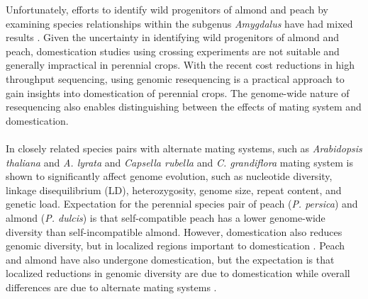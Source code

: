 \documentclass[12pt]{article}
\begin{document}
%
Unfortunately, efforts to identify wild progenitors of almond and peach by examining species relationships within the subgenus \emph{Amygdalus} have had mixed results \citep{verde2013high, aradhya2004molecular, zeinalabedini2010origin, mowrey1990isozyme, browicz1996genus, ladizinsky1999origin, bassi20081}. 
%
Given the uncertainty in identifying wild progenitors of almond and peach, domestication studies using crossing experiments are not suitable and generally impractical in perennial crops.
%
With the recent cost reductions in high throughput sequencing, using genomic resequencing is a practical approach to gain insights into domestication of perennial crops.
%
The genome-wide nature of resequencing also enables distinguishing between the effects of mating system and domestication.
%
\\
\\
In closely related species pairs with alternate mating systems, such as \emph{Arabidopsis thaliana} and \emph{A. lyrata} and \emph{Capsella rubella} and \emph{C. grandiflora} \citep{slotte2013capsella} mating system is shown to significantly affect genome evolution, such as nucleotide diversity, linkage disequilibrium (LD), heterozygosity, genome size, repeat content, and genetic load.
%
Expectation for the perennial species pair of peach (\emph{P. persica}) and almond (\emph{P. dulcis}) is that self-compatible peach has a lower genome-wide diversity than self-incompatible almond.
%
However, domestication also reduces genomic diversity, but in localized regions important to domestication \citep{glemin2006impact, doebley2006molecular, slotte2013capsella}.
%
Peach and almond have also undergone domestication, but the expectation is that localized reductions in genomic diversity are due to domestication while overall differences are due to alternate mating systems \citep{glemin2006impact, charlesworth2001breeding}. 
%
\end{document}

